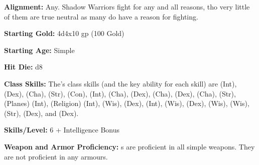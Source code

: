 
\textbf{Alignment:} Any. Shadow Warriors fight for any and all reasons, tho very little of them are true neutral as many do have a reason for fighting.

\textbf{Starting Gold:} 4d4x10 gp (100 Gold)

\textbf{Starting Age:} Simple

\textbf{Hit Die:} d8

\textbf{Class Skills:} The\currentclassname{}'s class skills (and the key ability for each skill) are  (Int),  (Dex),  (Cha),  (Str),  (Con),  (Int),  (Cha),  (Dex),  (Cha),  (Dex),  (Cha),  (Str),  (Planes) (Int),  (Religion) (Int),  (Wis),  (Dex),  (Int),  (Wis),  (Dex),  (Wis),  (Wis),  (Str),  (Dex), and  (Dex).


\textbf{Skills/Level:} 6 + Intelligence Bonus

\goodbab{}
\poorfor{}
\goodref{}
\poorwil{}

\begin{classtable}
\end{classtable}

\classfeatures

\textbf{Weapon and Armor Proficiency:} \currentclassname{}s are proficient in all simple weapons. They are not proficient in any armours.

